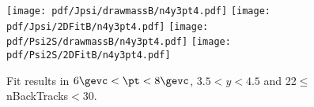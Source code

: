 \begin{figure}[H]
\begin{center}
\texttt{[image: pdf/Jpsi/drawmassB/n4y3pt4.pdf]}
\texttt{[image: pdf/Jpsi/2DFitB/n4y3pt4.pdf]}
\vspace*{-0.5cm}
\texttt{[image: pdf/Psi2S/drawmassB/n4y3pt4.pdf]}
\texttt{[image: pdf/Psi2S/2DFitB/n4y3pt4.pdf]}
\vspace*{-0.5cm}
\end{center}
\caption{Fit results in $6\gevc<\pt<8\gevc$, $3.5<y<4.5$ and 22$\leq$nBackTracks$<$30.}
\label{Fitn4y3pt4}
\end{figure}
